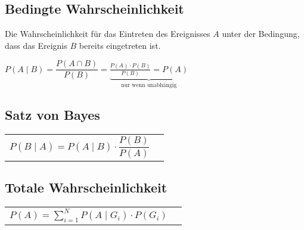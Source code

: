 	\subsection{Bedingte Wahrscheinlichkeit }
		Die Wahrscheinlichkeit für das Eintreten des Ereignisses $A$ unter der
		Bedingung, dass das Ereignis $B$ bereits eingetreten ist.
		\begin{center}
		$P(A\mid B)= \dfrac{P(A\cap B)}{P(B)}=\underbrace{\frac{P(A)\cdot
		P(B)}{P(B)}=P(A)}_{\text{nur wenn unabhängig}}$ 
		\end{center}

	\subsection{Satz von Bayes }
		\begin{tabular}{ll}
		$P(B\mid A)=P(A\mid B) \cdot\dfrac{P(B)}{P(A)}$\vspace{1mm}
		\end{tabular}


	\subsection{Totale Wahrscheinlichkeit }
		\begin{tabular}{ll}
        $P(A)=\sum\limits_{i=1}^N P(A\mid G_i)\cdot P(G_i)$
        \end{tabular}

